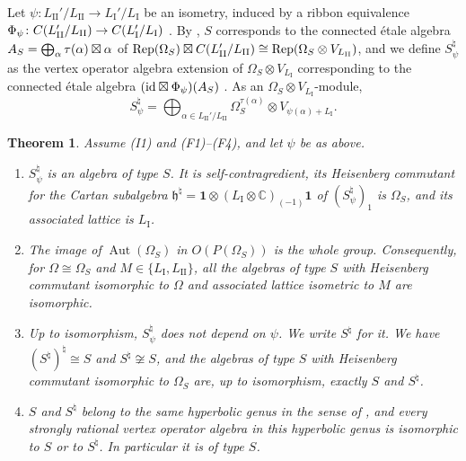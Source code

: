 \documentclass[leqno]{article}
\newcommand{\Cbb}{\ensuremath{\mathbb{C}}}
\let\cal\relax
\newcommand{\cal}{\mathcal}
\newcommand{\co}{\colon}
\newcommand{\ot}{\otimes}
\DeclareMathOperator{\Rep}{Rep}
\newtheorem{thm}{Theorem}[section]
\numberwithin{equation}{section}
\begin{document}
Let $\psi \co L_{\mathrm{II}}'/L_{\mathrm{II}} \to L_{\mathrm I}'/L_{\mathrm I}$ be an isometry, induced by a ribbon equivalence $\Phi_\psi \co \cal C(L_{\mathrm{II}}'/L_{\mathrm{II}}) \to \cal C(L_{\mathrm I}'/L_{\mathrm I})$ \cite[Section 8.4]{EGNO15}. By \cite{HKL15}, $S$ corresponds to the connected étale algebra $\cal A_S = \bigoplus_\alpha \tau(\alpha) \boxtimes \alpha$ of $\Rep(\Omega_S) \boxtimes \cal C(L_{\mathrm{II}}'/L_{\mathrm{II}}) \cong \Rep(\Omega_S \ot V_{L_{\mathrm{II}}})$, and we define $S^\natural_\psi$ as the vertex operator algebra extension of $\Omega_S \ot V_{L_{\mathrm I}}$ corresponding to the connected étale algebra $(\mathrm{id} \boxtimes \Phi_\psi)(\cal A_S)$ \cite{HKL15,CKM22}. As an $\Omega_S \ot V_{L_{\mathrm I}}$-module,
\begin{equation}
\label{eq:twin-decomposition}
S^\natural_\psi = \bigoplus_{\alpha \in L_{\mathrm{II}}'/L_{\mathrm{II}}} \Omega_S^{\tau(\alpha)} \ot V_{\psi(\alpha)+L_{\mathrm I}}.
\end{equation}

\begin{thm}
\label{thm:twin-S}
Assume \textup{(I1)} and \textup{(F1)}--\textup{(F4)}, and let $\psi$ be as above.
\begin{enumerate}
\item $S^\natural_\psi$ is an algebra of type $S$. It is self-contragredient, its Heisenberg commutant for the Cartan subalgebra $\mathfrak h^\natural = \mathbf 1 \ot (L_{\mathrm I} \ot \Cbb)_{(-1)}\mathbf 1$ of $(S^\natural_\psi)_1$ is $\Omega_S$, and its associated lattice is $L_{\mathrm I}$.
\item The image of $\operatorname{Aut}(\Omega_S)$ in $O(P(\Omega_S))$ is the whole group. Consequently, for $\Omega \cong \Omega_S$ and $M \in \{L_{\mathrm I},L_{\mathrm{II}}\}$, all the algebras of type $S$ with Heisenberg commutant isomorphic to $\Omega$ and associated lattice isometric to $M$ are isomorphic.
\item Up to isomorphism, $S^\natural_\psi$ does not depend on $\psi$. We write $S^\natural$ for it. We have $(S^\natural)^\natural \cong S$ and $S^\natural \not\cong S$, and the algebras of type $S$ with Heisenberg commutant isomorphic to $\Omega_S$ are, up to isomorphism, exactly $S$ and $S^\natural$.
\item $S$ and $S^\natural$ belong to the same hyperbolic genus in the sense of \cite[Definition 4.3]{MoR24a}, and every strongly rational vertex operator algebra in this hyperbolic genus is isomorphic to $S$ or to $S^\natural$. In particular it is of type $S$.
\end{enumerate}
\end{thm}
\end{document}
